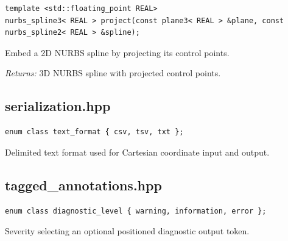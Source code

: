 \par\noindent\begin{minipage}{\linewidth}
\begin{lstlisting}[style=apireference]
template <std::floating_point REAL>
nurbs_spline3< REAL > project(const plane3< REAL > &plane, const nurbs_spline2< REAL > &spline);
\end{lstlisting}
{\footnotesize Embed a 2D NURBS spline by projecting its control points.\par}
{\footnotesize\textit{Returns:} 3D NURBS spline with projected control points.\par}
\end{minipage}\par\vspace{1pt}
\subsection{serialization.hpp}
\par\noindent\begin{minipage}{\linewidth}
\begin{lstlisting}[style=apireference]
enum class text_format { csv, tsv, txt };
\end{lstlisting}
{\footnotesize Delimited text format used for Cartesian coordinate input and output.\par}
\end{minipage}\par\vspace{1pt}
\subsection{tagged\_annotations.hpp}
\par\noindent\begin{minipage}{\linewidth}
\begin{lstlisting}[style=apireference]
enum class diagnostic_level { warning, information, error };
\end{lstlisting}
{\footnotesize Severity selecting an optional positioned diagnostic output token.\par}
\end{minipage}\par\vspace{1pt}
